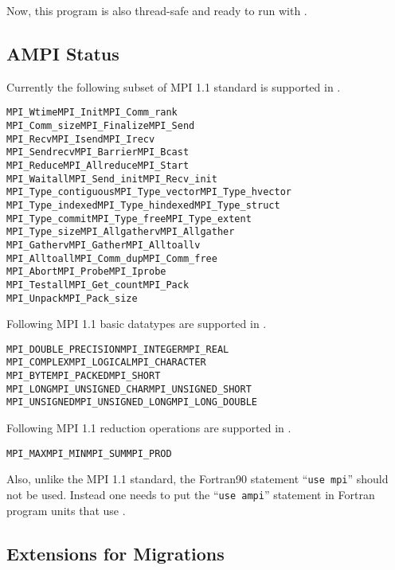 \documentclass[10pt]{article}
\begin{document}
Now, this program is also thread-safe and ready to run with \ampi{}.  

\subsection{AMPI Status}

Currently the following subset of MPI 1.1 standard is supported in \ampi{}.

\begin{alltt}
  MPI_Wtime           MPI_Init          MPI_Comm_rank       
  MPI_Comm_size       MPI_Finalize      MPI_Send         
  MPI_Recv            MPI_Isend         MPI_Irecv        
  MPI_Sendrecv        MPI_Barrier       MPI_Bcast
  MPI_Reduce          MPI_Allreduce     MPI_Start           
  MPI_Waitall         MPI_Send_init     MPI_Recv_init    
  MPI_Type_contiguous MPI_Type_vector   MPI_Type_hvector 
  MPI_Type_indexed    MPI_Type_hindexed MPI_Type_struct
  MPI_Type_commit     MPI_Type_free     MPI_Type_extent     
  MPI_Type_size       MPI_Allgatherv    MPI_Allgather    
  MPI_Gatherv         MPI_Gather        MPI_Alltoallv    
  MPI_Alltoall        MPI_Comm_dup      MPI_Comm_free
  MPI_Abort           MPI_Probe         MPI_Iprobe
  MPI_Testall         MPI_Get_count     MPI_Pack
  MPI_Unpack          MPI_Pack_size
\end{alltt}

Following MPI 1.1 basic datatypes are supported in \ampi{}.

\begin{alltt}
MPI_DOUBLE_PRECISION MPI_INTEGER       MPI_REAL          
MPI_COMPLEX          MPI_LOGICAL       MPI_CHARACTER     
MPI_BYTE             MPI_PACKED        MPI_SHORT            
MPI_LONG             MPI_UNSIGNED_CHAR MPI_UNSIGNED_SHORT
MPI_UNSIGNED         MPI_UNSIGNED_LONG MPI_LONG_DOUBLE
\end{alltt}

Following MPI 1.1 reduction operations are supported in \ampi{}.

\begin{alltt}
MPI_MAX  MPI_MIN  MPI_SUM  MPI_PROD
\end{alltt}

Also, unlike the MPI 1.1 standard, the Fortran90 statement ``\texttt{use mpi}'' 
should not be used.
Instead one needs to put the ``\texttt{use ampi}'' statement in Fortran
program units that use \ampi{}.

\subsection{Extensions for Migrations}
\end{document}
